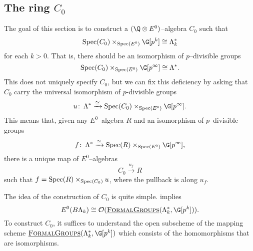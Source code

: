 \subsection*{The ring \(C_0\)}


The goal of this section is to construct a \((\Q \otimes E^0)\)--algebra \(C_0\) such that
\[
\Spec(C_0) \times_{\Spec(E^0)} \G[p^k] \cong \Lambda_{k}^*
\]
for each \(k>0\). That is, there should be an isomorphism of \(p\)--divisible groups
\[
\Spec(C_0) \times_{\Spec(E^0)} \G[p^\infty] \cong \Lambda^*.
\]
This does not uniquely specify \(C_0\), but we can fix this deficiency by asking that \(C_0\) carry the universal isomorphism of \(p\)-divisible groups 
\[
u \co \Lambda^* \xrightarrow{\cong} \Spec(C_0) \times_{\Spec(E^0)} \G[p^\infty].
\]
This means that, given any \(E^0\)--algebra \(R\) and an isomorphism of \(p\)--divisible groups
\[
f \co \Lambda^* \xrightarrow{\cong} \Spec(R) \times_{\Spec(E^0)} \G[p^\infty],
\]
there is a unique map of \(E^0\)--algebras
\[
C_0 \xrightarrow{u_f} R
\]
such that \(f = \operatorname{Spec}(R) \times_{\operatorname{Spec}(C_0)} u\), where the pullback is along \(u_f\).

The idea of the construction of \(C_0\) is quite simple.   implies \[E^0(B\Lk) \cong \sheaf O(\InternalHom{FormalGroups}(\Lk^*,\G[p^k])).\]  To construct \(C_0\), it suffices to understand the open subscheme of the mapping scheme \(\InternalHom{FormalGroups}(\Lk^*,\G[p^k])\) which consists of the homomorphisms that are isomorphisms. 

